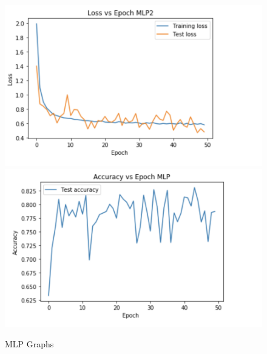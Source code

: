 \documentclass[10pt]{article}
\begin{document}
\begin{figure}[h]
\centering
\includegraphics[scale=0.3]{LOSS MLP}
\includegraphics[scale=0.3]{ACC MLP}
\caption{MLP Graphs}
\end{figure}
\end{document}
